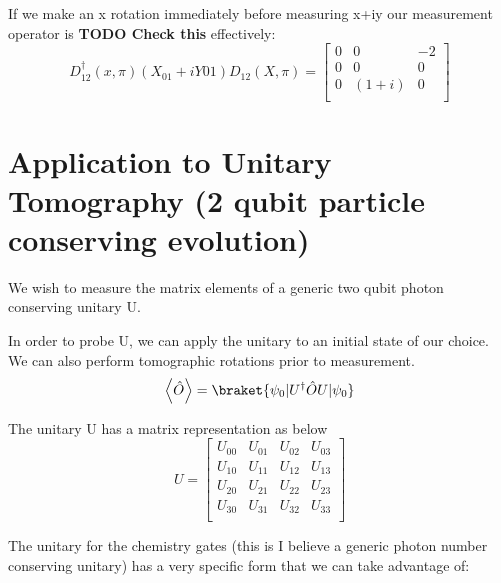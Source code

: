 If we make an x rotation immediately before measuring x+iy our measurement operator is \textbf{TODO Check this} effectively:
\begin{equation}
    D_{12}^{\dagger}(x,\pi)(X_{01}+iY{01})D_{12}(X,\pi) =
    \begin{bmatrix}
        0 & 0 & -2 \\
        0 & 0 & 0 \\
        0 & (1+i) & 0 \\
    \end{bmatrix}
\end{equation}


\section{Application to Unitary Tomography (2 qubit particle conserving evolution)}
We wish to measure the matrix elements of a generic two qubit photon conserving unitary U.

In order to probe U, we can apply the unitary to an initial state of our choice.  We can also perform tomographic rotations prior to measurement.
\begin{equation}
    \left< \hat{O} \right> = \braket{\psi_0 | U^{\dagger} \hat{O} U | \psi_0 }
\end{equation}

The unitary U has a matrix representation as below
\begin{equation}
    U =
    \begin{bmatrix}
        U_{00} & U_{01} & U_{02} & U_{03} \\
        U_{10} & U_{11} & U_{12} & U_{13} \\
        U_{20} & U_{21} & U_{22} & U_{23} \\
        U_{30} & U_{31} & U_{32} & U_{33} \\
    \end{bmatrix}
\end{equation}

The unitary for the chemistry gates (this is I believe a generic photon number conserving unitary) has a very specific form that we can take advantage of:


